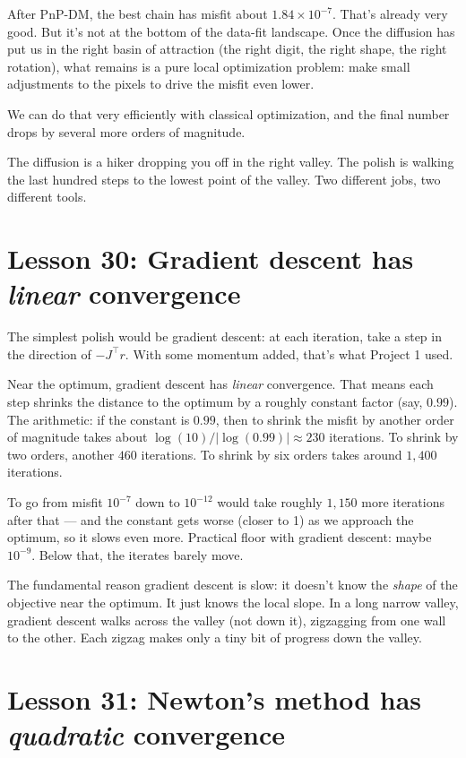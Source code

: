 \documentclass[11pt]{article}
\begin{document}
After PnP-DM, the best chain has misfit about $1.84 \times 10^{-7}$.
That's already very good. But it's not at the bottom of the data-fit
landscape. Once the diffusion has put us in the right basin of
attraction (the right digit, the right shape, the right rotation),
what remains is a pure local optimization problem: make small
adjustments to the pixels to drive the misfit even lower.

We can do that very efficiently with classical optimization, and the
final number drops by several more orders of magnitude.

\begin{intuition}
The diffusion is a hiker dropping you off in the right valley. The
polish is walking the last hundred steps to the lowest point of the
valley. Two different jobs, two different tools.
\end{intuition}

\section{Lesson 30: Gradient descent has \emph{linear} convergence}

The simplest polish would be gradient descent: at each iteration,
take a step in the direction of $-J^\top r$. With some momentum
added, that's what Project 1 used.

Near the optimum, gradient descent has \emph{linear} convergence.
That means each step shrinks the distance to the optimum by a roughly
constant factor (say, $0.99$). The arithmetic: if the constant is
$0.99$, then to shrink the misfit by another order of magnitude
takes about $\log(10) / |\log(0.99)| \approx 230$ iterations. To
shrink by two orders, another $460$ iterations. To shrink by six
orders takes around $1{,}400$ iterations.

To go from misfit $10^{-7}$ down to $10^{-12}$ would take roughly
$1{,}150$ more iterations after that --- and the constant gets worse
(closer to 1) as we approach the optimum, so it slows even more.
Practical floor with gradient descent: maybe $10^{-9}$. Below that,
the iterates barely move.

The fundamental reason gradient descent is slow: it doesn't know the
\emph{shape} of the objective near the optimum. It just knows the local
slope. In a long narrow valley, gradient descent walks across the
valley (not down it), zigzagging from one wall to the other. Each
zigzag makes only a tiny bit of progress down the valley.

\section{Lesson 31: Newton's method has \emph{quadratic} convergence}
\end{document}
